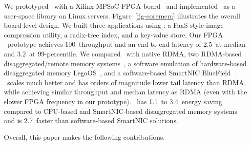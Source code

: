 We prototyped \sysboard\ with a Xilinx MPSoC FPGA board~\cite{ZCU106} and implemented \syslib\ as a user-space library on Linux servers. 
Figure~\ref{fig-coremem} illustrates the overall board-level design.
We built three applications using \sys:
a FaaS-style image compression utility, a radix-tree index, and a key-value store.
Our FPGA \sys\ prototype achieves 100\Gbps\ throughput and an end-to-end latency of 2.5\mus\ at median and 3.2\mus\ at 99-percentile.
We compared \sys\ with native RDMA, two RDMA-based disaggregated/remote memory systems~\cite{Tsai20-ATC,Kalia14-RDMAKV}, 
a software emulation of hardware-based disaggregated memory LegoOS~\cite{Shan18-OSDI},
and a software-based SmartNIC BlueField~\cite{BlueField}.
\sys\ scales much better and has orders of magnitude lower tail latency than RDMA, 
while achieving similar throughput and median latency as RDMA (even with the slower FPGA frequency in our prototype).
\sys\ has 1.1\x\ to 3.4\x\ energy saving compared to CPU-based and SmartNIC-based disaggregated memory systems 
and is 2.7\x\ faster than software-based SmartNIC solutions. 


Overall, this paper makes the following contributions.

